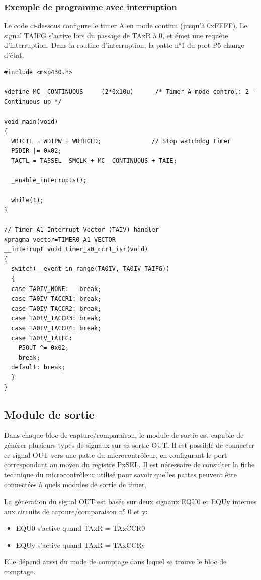 \begin{minipage}{16cm}{
\subsubsection*{Exemple de programme avec interruption}
Le code ci-dessous configure le timer A en mode continu (jusqu'à 0xFFFF). Le signal TAIFG s'active lors du passage de TAxR à 0, et émet une requête d'interruption. Dans la routine d'interruption, la patte n°1 du port P5 change d'état.

\lstset{style=customc}
\begin{lstlisting}
#include <msp430.h>

#define MC__CONTINUOUS     (2*0x10u)      /* Timer A mode control: 2 - Continuous up */

void main(void)
{
  WDTCTL = WDTPW + WDTHOLD;              // Stop watchdog timer
  P5DIR |= 0x02;
  TACTL = TASSEL__SMCLK + MC__CONTINUOUS + TAIE;
  
  _enable_interrupts();
  
  while(1);
}

// Timer_A1 Interrupt Vector (TAIV) handler
#pragma vector=TIMER0_A1_VECTOR
__interrupt void timer_a0_ccr1_isr(void)
{
  switch(__event_in_range(TA0IV, TA0IV_TAIFG))
  {
  case TA0IV_NONE:   break;
  case TA0IV_TACCR1: break;
  case TA0IV_TACCR2: break;
  case TA0IV_TACCR3: break;
  case TA0IV_TACCR4: break;
  case TA0IV_TAIFG:
    P5OUT ^= 0x02;
    break;
  default: break;
  }
}
\end{lstlisting}
}
\end{minipage}

\subsection{Module de sortie}
\label{Module de sortie}
Dans chaque bloc de capture/comparaison, le module de sortie est capable de générer plusieurs types de signaux sur sa sortie OUT. Il est possible de connecter ce signal OUT vers une patte du microcontrôleur, en configurant le port correspondant au moyen du registre PxSEL.
Il est nécessaire de consulter la fiche technique du microcontrôleur utilisé pour savoir quelles pattes peuvent être connectées à quels modules de sortie de timer.

La génération du signal OUT est basée sur deux signaux EQU0 et EQUy internes aux circuits de capture/comparaison n° 0 et y:
\begin{itemize}[label=\textbullet,font=\small]
\item EQU0 s'active quand TAxR = TAxCCR0
\item EQUy s'active quand TAxR = TAxCCRy
\end{itemize}
Elle dépend aussi du mode de comptage dans lequel se trouve le bloc de comptage.

